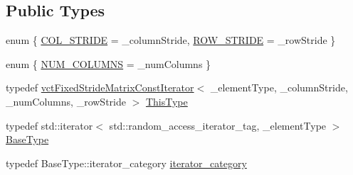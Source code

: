 \subsection*{Public Types}
\begin{DoxyCompactItemize}
\item 
enum \{ \hyperlink{classvct_fixed_stride_matrix_const_iterator_a1450ce9893d7c94450455553be9301c7a6321f5a6143e3e2aaf22f5e7e2f122cb}{C\+O\+L\+\_\+\+S\+T\+R\+I\+D\+E} = \+\_\+column\+Stride, 
\hyperlink{classvct_fixed_stride_matrix_const_iterator_a1450ce9893d7c94450455553be9301c7a8c8f6befb5bdf8e0e6e56185719c40dd}{R\+O\+W\+\_\+\+S\+T\+R\+I\+D\+E} = \+\_\+row\+Stride
 \}
\item 
enum \{ \hyperlink{classvct_fixed_stride_matrix_const_iterator_aa3bb07c9470b580a2b850046d65716b0a521c9c859f1aef445dbbbb695bec6563}{N\+U\+M\+\_\+\+C\+O\+L\+U\+M\+N\+S} = \+\_\+num\+Columns
 \}
\item 
typedef \hyperlink{classvct_fixed_stride_matrix_const_iterator}{vct\+Fixed\+Stride\+Matrix\+Const\+Iterator}$<$ \+\_\+element\+Type, \+\_\+column\+Stride, \+\_\+num\+Columns, \+\_\+row\+Stride $>$ \hyperlink{classvct_fixed_stride_matrix_const_iterator_a8c6ee7d655fb71d647506c3964a18e2c}{This\+Type}
\item 
typedef std\+::iterator$<$ std\+::random\+\_\+access\+\_\+iterator\+\_\+tag, \+\_\+element\+Type $>$ \hyperlink{classvct_fixed_stride_matrix_const_iterator_a305e6edbe5e4e2560f9bf01d3079a118}{Base\+Type}
\item 
typedef Base\+Type\+::iterator\+\_\+category \hyperlink{classvct_fixed_stride_matrix_const_iterator_a31bfb3c59476ee6060ec1d08874c0419}{iterator\+\_\+category}
\end{DoxyCompactItemize}
